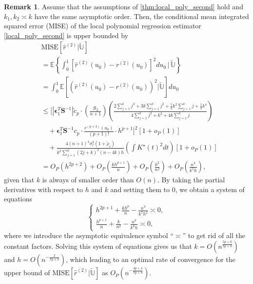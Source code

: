\documentclass{uwstat572}
\theoremstyle{definition}
\newtheorem{Remark}{Remark}
\renewcommand{\hat}{\widehat}
\renewcommand{\tilde}{\widetilde}
\theoremstyle{theorem}
\begin{document}
\begin{Remark}
\label{remark:MISE_loc_poly_second}
Assume that the assumptions of \autoref{thm:local_poly_second} hold and $k_1,k_2 \asymp k$ have the same asymptotic order. Then, the conditional mean integrated squared error (MISE) of the local polynomial regression estimator \eqref{local_poly_second} is upper bounded by
\begin{align*}
	&\mathrm{MISE}\left[\hat{r}^{(2)} \big|\tilde{\mathbb{U}}\right] \\
	&= \mathbb{E}\left\{\int_0^1 \left[\hat{r}^{(2)}(u_0) -r^{(2)}(u_0)\right]^2 du_0 \,\Big|\, \tilde{\mathbb{U}}\right\}\\
	&= \int_0^1 \mathbb{E}\left[\left(\hat{r}^{(2)}(u_0) -r^{(2)}(u_0)\right)^2 \Big| \tilde{\mathbb{U}} \right] du_0\\
	&\leq \Bigg[\left|\bm{\epsilon}_1^T \bm{S}^{-1} \right|\tilde{c}_p\cdot \left(\frac{\mathcal{B}_2}{n+1}\right) \left(\frac{2\sum_{j=1}^k j^3 + 3k \sum_{j=1}^k j^2 + \frac{5}{3} k^2 \sum_{j=1}^k j + \frac{1}{3} k^4}{4 \sum_{j=1}^k j^2 + k^3 + 4k\sum_{j=1}^k j} \right)\\
	&\quad + \bm{\epsilon}_1^T \bm{S}^{-1} c_p \cdot \frac{r^{(p+3)}(u_0)}{(p+1)!}\cdot h^{p+1} \Bigg]^2 \left[1+o_P(1)\right] \\
	&\quad + \frac{4(n+1)^4\sigma_e^2(1+\acute{\rho}_c)}{k^2 \sum_{j=1}^k (2j+k)^2 (n-4k) h} \left(\int K^{\star}(t)^2 dt\right) \left[1+o_P(1)\right] \\
	&= O_P\left(h^{2p+2}\right) + O_P\left(\frac{kh^{p+1}}{n}\right) + O_P\left(\frac{k^2}{n^2}\right) + O_P\left(\frac{n^3}{k^5h}\right),
	\end{align*}
given that $k$ is always of smaller order than $O(n)$. By taking the partial derivatives with respect to $h$ and $k$ and setting them to 0, we obtain a system of equations
\[
\begin{cases}
	h^{2p+1} + \frac{kh^p}{n} - \frac{n^3}{k^5h^2} \asymp 0,\\
	\frac{h^{p+1}}{n} + \frac{k}{n^2} - \frac{n^3}{k^6 h} \asymp 0,
\end{cases}
\]
where we introduce the asymptotic equivalence symbol ``$\asymp$'' to get rid of all the constant factors. Solving this system of equations gives us that $k=O\left(n^{\frac{5p+6}{7p+8}}\right)$ and $h=O\left(n^{-\frac{2}{7p+8}}\right)$, which leading to an optimal rate of convergence for the upper bound of $\mathrm{MISE}\left[\hat{r}^{(2)} \big|\tilde{\mathbb{U}}\right]$ as $O_P\left(n^{-\frac{4p+4}{7p+8}}\right)$.
\end{Remark}
\end{document}
